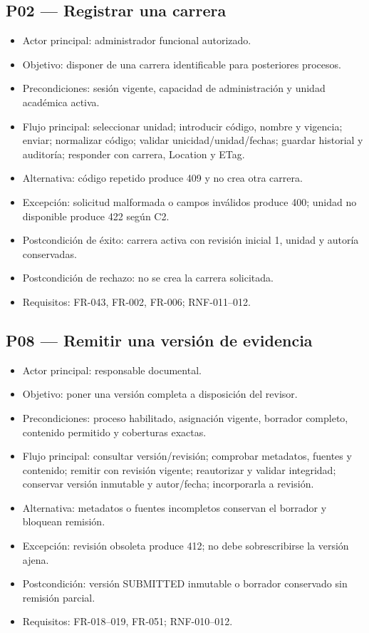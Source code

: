 \documentclass[12pt,a4paper]{report}
\providecommand{\tightlist}{\setlength{\itemsep}{0pt}\setlength{\parskip}{0pt}}
\begin{document}
\subsection{P02 --- Registrar una
carrera}\label{p02-registrar-una-carrera}

\begin{itemize}
\tightlist
\item
  Actor principal: administrador funcional autorizado.
\item
  Objetivo: disponer de una carrera identificable para posteriores
  procesos.
\item
  Precondiciones: sesión vigente, capacidad de administración y unidad
  académica activa.
\item
  Flujo principal: seleccionar unidad; introducir código, nombre y
  vigencia; enviar; normalizar código; validar unicidad/unidad/fechas;
  guardar historial y auditoría; responder con carrera, Location y ETag.
\item
  Alternativa: código repetido produce 409 y no crea otra carrera.
\item
  Excepción: solicitud malformada o campos inválidos produce 400; unidad
  no disponible produce 422 según C2.
\item
  Postcondición de éxito: carrera activa con revisión inicial 1, unidad
  y autoría conservadas.
\item
  Postcondición de rechazo: no se crea la carrera solicitada.
\item
  Requisitos: FR-043, FR-002, FR-006; RNF-011--012.
\end{itemize}

\subsection{P08 --- Remitir una versión de
evidencia}\label{p08-remitir-una-versiuxf3n-de-evidencia}

\begin{itemize}
\tightlist
\item
  Actor principal: responsable documental.
\item
  Objetivo: poner una versión completa a disposición del revisor.
\item
  Precondiciones: proceso habilitado, asignación vigente, borrador
  completo, contenido permitido y coberturas exactas.
\item
  Flujo principal: consultar versión/revisión; comprobar metadatos,
  fuentes y contenido; remitir con revisión vigente; reautorizar y
  validar integridad; conservar versión inmutable y autor/fecha;
  incorporarla a revisión.
\item
  Alternativa: metadatos o fuentes incompletos conservan el borrador y
  bloquean remisión.
\item
  Excepción: revisión obsoleta produce 412; no debe sobrescribirse la
  versión ajena.
\item
  Postcondición: versión SUBMITTED inmutable o borrador conservado sin
  remisión parcial.
\item
  Requisitos: FR-018--019, FR-051; RNF-010--012.
\end{itemize}
\end{document}
